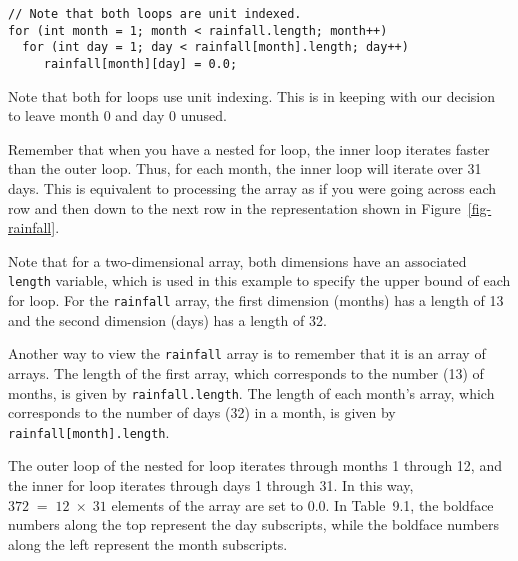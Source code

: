 \begin{jjjlisting}
\begin{lstlisting}
// Note that both loops are unit indexed.
for (int month = 1; month < rainfall.length; month++)
  for (int day = 1; day < rainfall[month].length; day++)
     rainfall[month][day] = 0.0;
\end{lstlisting}
\end{jjjlisting}

\noindent Note that both for loops use unit indexing.  This is
in keeping with our decision to leave month 0 and day 0 unused.

Remember that when you have a nested for loop, the inner loop iterates
faster than the outer loop.  Thus, for each month, the inner loop will
iterate over 31 days.  This is equivalent to processing the array
as if you were going across each row and then down to the next
row in the representation shown in Figure~\ref{fig-rainfall}.

Note that for a two-dimensional array, both dimensions have an
associated {\tt length} variable, which is used in this example to
specify the upper bound of each for loop.  For the {\tt rainfall}
array, the first dimension (months) has a length of 13 and the second
dimension (days) has a length of 32.

Another way to view the {\tt rainfall} array is to remember that it is
an array of arrays. The length of the first array, which
corresponds to the number (13) of months, is given by
{\tt rainfall.length}. The length of each month's array, which corresponds
to the number of days (32) in a month, is given by
{\tt rainfall[month].length}.

The outer loop of the nested for loop iterates through months 1
through 12, and the inner for loop iterates through days 1 through
31.  In this way,  $372\; =\; 12\;\times\; 31$ elements of the array are set to 0.0.
In Table~9.1, the boldface numbers along the top
represent the day subscripts, while the boldface numbers along the
left represent the month subscripts.


